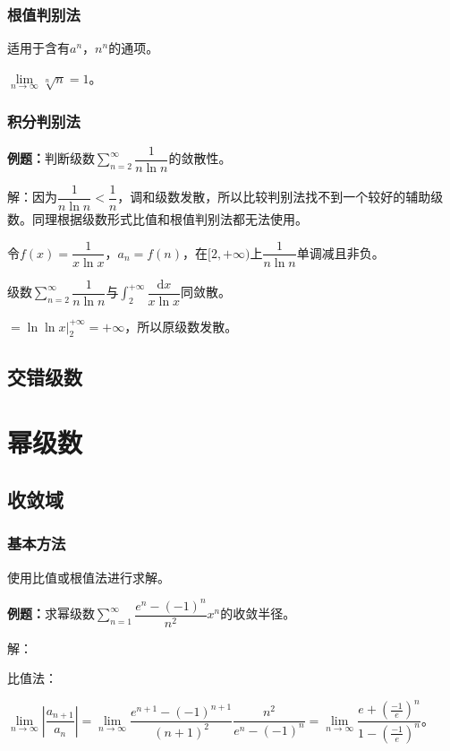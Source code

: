 \documentclass[UTF8, 12pt]{ctexart}
\begin{document}
\subsubsection{根值判别法}

适用于含有$a^n$，$n^n$的通项。

$\lim\limits_{n\to\infty}\sqrt[n]{n}=1$。

\subsubsection{积分判别法}

\textbf{例题：}判断级数$\sum\limits_{n=2}^\infty\dfrac{1}{n\ln n}$的敛散性。

解：因为$\dfrac{1}{n\ln n}<\dfrac{1}{n}$，调和级数发散，所以比较判别法找不到一个较好的辅助级数。同理根据级数形式比值和根值判别法都无法使用。

令$f(x)=\dfrac{1}{x\ln x}$，$a_n=f(n)$，在$[2,+\infty)$上$\dfrac{1}{n\ln n}$单调减且非负。

级数$\sum\limits_{n=2}^\infty\dfrac{1}{n\ln n}$与$\int_2^{+\infty}\dfrac{\textrm{d}x}{x\ln x}$同敛散。

$=\ln\ln x\vert_2^{+\infty}=+\infty$，所以原级数发散。

\subsection{交错级数}

\section{幂级数}

\subsection{收敛域}

\subsubsection{基本方法}

使用比值或根值法进行求解。

\textbf{例题：}求幂级数$\sum\limits_{n=1}^\infty\dfrac{e^n-(-1)^n}{n^2}x^n$的收敛半径。

解：

比值法：

$\lim\limits_{n\to\infty}\left\vert\dfrac{a_{n+1}}{a_n}\right\vert=\lim\limits_{n\to\infty}\dfrac{e^{n+1}-(-1)^{n+1}}{(n+1)^2}\dfrac{n^2}{e^n-(-1)^n}=\lim\limits_{n\to\infty}\dfrac{e+(\frac{-1}{e})^n}{1-(\frac{-1}{e})^n}$。
\end{document}
